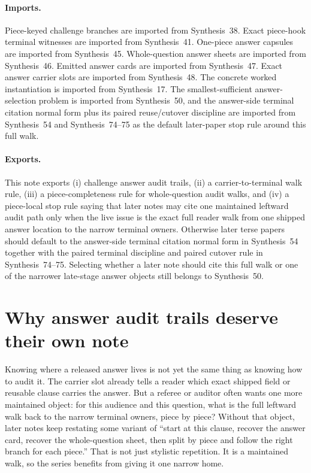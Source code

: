 \documentclass[11pt]{article}
\begin{document}
\paragraph{Imports.}
Piece-keyed challenge branches are imported from Synthesis~38.\cite{series:challengebranches}
Exact piece-hook terminal witnesses are imported from Synthesis~41.\cite{series:challengeterminalwitnesses}
One-piece answer capsules are imported from Synthesis~45.\cite{series:challengeanswercapsules}
Whole-question answer sheets are imported from Synthesis~46.\cite{series:challengeanswersheets}
Emitted answer cards are imported from Synthesis~47.\cite{series:challengeanswercards}
Exact answer carrier slots are imported from Synthesis~48.\cite{series:challengeanswercarrierslots}
The concrete worked instantiation is imported from Synthesis~17.\cite{series:workedexample}
The smallest-sufficient answer-selection problem is imported from Synthesis~50, and the answer-side terminal citation normal form plus its paired reuse/cutover discipline are imported from Synthesis~54 and Synthesis~74--75 as the default later-paper stop rule around this full walk.\cite{series:challengeanswercitationdockets,series:challengeanswerreviewmenus,series:pairedterminalcitationdiscipline,series:pairedterminalcutoverrules}

\paragraph{Exports.}
This note exports (i) challenge answer audit trails, (ii) a carrier-to-terminal walk rule, (iii) a piece-completeness rule for whole-question audit walks, and (iv) a piece-local stop rule saying that later notes may cite one maintained leftward audit path only when the live issue is the exact full reader walk from one shipped answer location to the narrow terminal owners.
Otherwise later terse papers should default to the answer-side terminal citation normal form in Synthesis~54 together with the paired terminal discipline and paired cutover rule in Synthesis~74--75. Selecting whether a later note should cite this full walk or one of the narrower late-stage answer objects still belongs to Synthesis~50.\cite{series:challengeanswercitationdockets,series:challengeanswerreviewmenus,series:pairedterminalcitationdiscipline,series:pairedterminalcutoverrules}

\section{Why answer audit trails deserve their own note}
Knowing where a released answer lives is not yet the same thing as knowing how to audit it.
The carrier slot already tells a reader which exact shipped field or reusable clause carries the answer.
But a referee or auditor often wants one more maintained object: for this audience and this question, what is the full leftward walk back to the narrow terminal owners, piece by piece?
Without that object, later notes keep restating some variant of ``start at this clause, recover the answer card, recover the whole-question sheet, then split by piece and follow the right branch for each piece.''
That is not just stylistic repetition.
It is a maintained walk, so the series benefits from giving it one narrow home.
\end{document}
